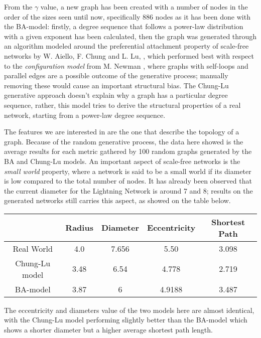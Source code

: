 	
	From the $\gamma$ value, a new graph has been created with a number of nodes in the order of the sizes seen until now, specifically 886 nodes as it has been done with the BA-model: firstly, a degree sequence that follows a power-law distribution with a given exponent has been calculated, then the graph was generated through an algorithm modeled around the preferential attachment property of scale-free networks by W. Aiello, F. Chung and L. Lu, \cite{Aiello2001} \cite{Chung2002}, which performed best with respect to the \textit{configuration model} from M. Newman \cite{Newman2003}, where graphs with self-loops and parallel edges are a possible outcome of the generative process; manually removing these would cause an important structural bias. The Chung-Lu generative approach doesn't explain why a graph has a particular degree sequence, rather, this model tries to derive the structural properties of a real network, starting from a power-law degree sequence.
	
	The features we are interested in are the one that describe the topology of a graph. Because of the random generative process, the data here showed is the average results for each metric gathered by 100 random graphs generated by the BA and Chung-Lu models. An important aspect of scale-free networks is the \textit{small world} property, where a network is said to be a small world if its diameter is low compared to the total number of nodes. It has already been observed that the current diameter for the Lightning Network is around 7 and 8; results on the generated networks still carries this aspect, as showed on the table below.
	
	\begin{center}
		\begin{tabulary}{\linewidth}{| C | C | C | C | C |}
			\hline
			& Radius & Diameter & Eccentricity & Shortest Path \\ \hline
			Real World & 4.0 & 7.656 & 5.50 & 3.098 \\ \hline
			Chung-Lu model & 3.48 & 6.54 &  4.778 &  2.719 \\ \hline
			BA-model & 3.87 & 6 & 4.9188 & 3.487 \\ 
			\hline
		\end{tabulary}
	\end{center}
	The eccentricity and diameters value of the two models here are almost identical, with the Chung-Lu model performing slightly better than the BA-model which shows a shorter diameter but a higher average shortest path length.
	
